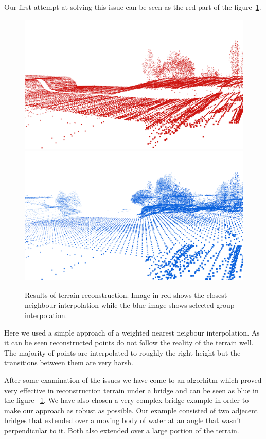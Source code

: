 \documentclass{egpubl-eurovis-star}
\begin{document}
Our first attempt at solving this issue can be seen as the red part of the figure~\ref{fig1}.
\begin{figure}[ht]
    \centering
    \includegraphics[width=1\columnwidth]{terrain_inter.png}
    \includegraphics[width=1\columnwidth]{terrain_br.png}
    \caption{Results of terrain reconstruction. Image in red shows the closest neighbour interpolation while the blue image shows selected group interpolation.}
    \label{fig1}
\end{figure}

Here we used a simple approach of a weighted nearest neigbour interpolation. 
As it can be seen reconstructed points do not follow the reality of the terrain well.
The majority of points are interpolated to roughly the right height but the transitions between them are very harsh.

After some examination of the issues we have come to an algorhitm which proved very effective in reconstruction terrain under a bridge and can be seen as blue in the figure ~\ref{fig1}.
We have also chosen a very complex bridge example in order to make our approach as robust as possible.
Our example consisted of two adjecent bridges that extended over a moving body of water at an angle that wasn't perpendicular to it.
Both also extended over a large portion of the terrain.
\end{document}
